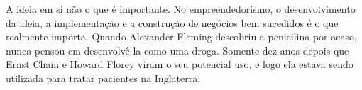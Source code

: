 A ideia em si não o que é importante.  No empreendedorismo, o 
desenvolvimento da ideia, a implementação e a construção de negócios bem
sucedidos é o que realmente importa.  Quando Alexander Fleming descobriu
a penicilina por acaso, nunca pensou em desenvolvê-la como uma droga.
Somente dez anos depois que Ernst Chain e Howard Florey viram o
seu potencial uso, e logo ela estava sendo utilizada para tratar pacientes
na Inglaterra.
